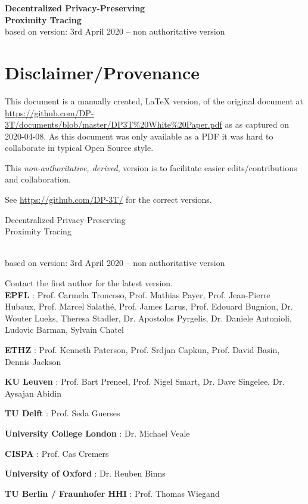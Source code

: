 \documentclass[12pt,a4paper]{article}
\begin{document}
\thispagestyle{specialfooter}
\onehalfspace

\begin{center}{\bfseries\Large
Decentralized Privacy-Preserving\\
Proximity Tracing}\\[0.5cm]
 based on version: 3rd April 2020 -- non authoritative version \\

 \section*{Disclaimer/Provenance}

This document is a manually created, LaTeX version, of the original document at \url{https://github.com/DP-3T/documents/blob/master/DP3T\%20White\%20Paper.pdf} as 
as captured on 2020-04-08. As this document was only available as a PDF it was hard to collaborate in typical Open Source style.

This\emph{ non-authoritative, derived}, version is to facilitate easier edits/contributions and collaboration.

See \url{https://github.com/DP-3T/} for the correct versions.
\end{center}

\pagebreak
\begin{center}{\bfseries\Large

Decentralized Privacy-Preserving\\
Proximity Tracing}\\[0.5cm]
 based on version: 3rd April 2020 -- non authoritative version 

Contact the first author for the latest version.\\[1cm]
\textbf{EPFL} : Prof. Carmela Troncoso, Prof. Mathias Payer, Prof. Jean-Pierre\\
Hubaux, Prof. Marcel Salathé, Prof. James Larus, Prof. Edouard
Bugnion, Dr. Wouter Lueks, Theresa Stadler, Dr. Apostolos Pyrgelis, Dr.
Daniele Antonioli, Ludovic Barman, Sylvain Chatel

\textbf{ETHZ} : Prof. Kenneth Paterson, Prof. Srdjan Capkun, Prof. David Basin,
Dennis Jackson

\textbf{KU Leuven} : Prof. Bart Preneel, Prof. Nigel Smart, Dr. Dave Singelee,
Dr. Aysajan Abidin

\textbf{TU Delft} : Prof. Seda Guerses

\textbf{University College London} : Dr. Michael Veale

\textbf{CISPA} : Prof. Cas Cremers

\textbf{University of Oxford} : Dr. Reuben Binns

\textbf{TU Berlin / Fraunhofer HHI} : Prof. Thomas Wiegand
\end{center}
\clearpage
\singlespace
\end{document}
